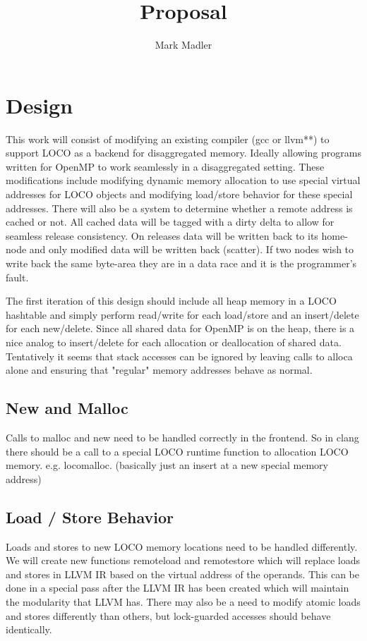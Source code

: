 \documentclass[sigplan,nonacm]{acmart}
\title{Proposal}
\author{Mark Madler}
\begin{document}
\maketitle

\section{Design}
This work will consist of modifying an existing compiler (gcc or llvm**) to 
support LOCO as a backend for disaggregated memory. Ideally allowing programs 
written for OpenMP to work seamlessly in a disaggregated setting.
These modifications include modifying dynamic memory allocation to use special 
virtual addresses for LOCO objects and modifying load/store behavior for these 
special addresses. 
There will also be a system to determine whether a remote address is cached or not.
All cached data will be tagged with a dirty delta to allow for seamless release consistency. 
On releases data will be written back to its home-node and only modified data will be written back 
(scatter). If two nodes wish to write back the same byte-area they are in a data race 
and it is the programmer's fault. 

The first iteration of this design should include all heap memory in a LOCO hashtable and
simply perform read/write for each load/store and an insert/delete for each new/delete. 
Since all shared data for OpenMP is on the heap, there is a nice analog to insert/delete 
for each allocation or deallocation of shared data. Tentatively it seems that stack
accesses can be ignored by leaving calls to alloca alone and ensuring that "regular" 
memory addresses behave as normal.

\subsection{New and Malloc}
Calls to malloc and new need to be handled correctly in the frontend. So in clang
there should be a call to a special LOCO runtime function to allocation LOCO memory.
e.g. locomalloc. (basically just an insert at a new special memory address)


\subsection{Load / Store Behavior}
Loads and stores to new LOCO memory locations need to be handled differently. 
We will create new functions remoteload and remotestore which will replace
loads and stores in LLVM IR based on the virtual address of the operands.
This can be done in a special pass after the LLVM IR has been created which will maintain the 
modularity that LLVM has. There may also be a need to modify atomic loads and stores 
differently than others, but lock-guarded accesses should behave identically.
\end{document}
